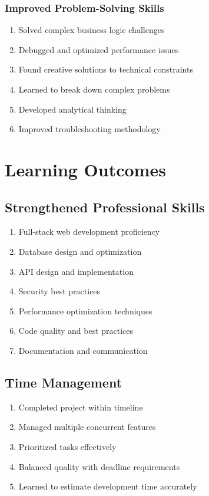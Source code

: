 \documentclass[12pt,a4paper]{report}
\begin{document}
\subsubsection{Improved Problem-Solving Skills}

\begin{enumerate}[label=\roman*)]
    \item Solved complex business logic challenges
    \item Debugged and optimized performance issues
    \item Found creative solutions to technical constraints
    \item Learned to break down complex problems
    \item Developed analytical thinking
    \item Improved troubleshooting methodology
\end{enumerate}

\section{Learning Outcomes}

\subsection{Strengthened Professional Skills}

\begin{enumerate}[label=\roman*)]
    \item Full-stack web development proficiency
    \item Database design and optimization
    \item API design and implementation
    \item Security best practices
    \item Performance optimization techniques
    \item Code quality and best practices
    \item Documentation and communication
\end{enumerate}

\subsection{Time Management}

\begin{enumerate}[label=\roman*)]
    \item Completed project within timeline
    \item Managed multiple concurrent features
    \item Prioritized tasks effectively
    \item Balanced quality with deadline requirements
    \item Learned to estimate development time accurately
\end{enumerate}
\end{document}
